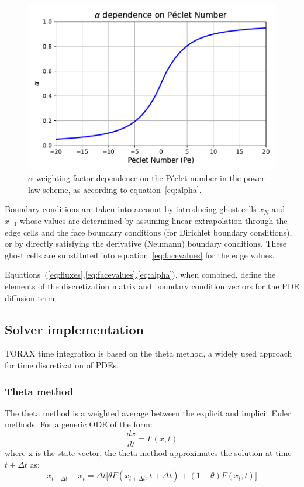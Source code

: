 \documentclass[aps, reprint, nofootinbib]{revtex4-2}
\begin{document}
\begin{figure}[hbt]
    \includegraphics[width=1.0\linewidth]{figure3_peclet.pdf}
    \caption{\footnotesize $\alpha$ weighting factor dependence on the P\'{e}clet number in the power-law scheme, as according to equation~\ref{eq:alpha}.}
    \label{fig:peclet}
\end{figure}

Boundary conditions are taken into account by introducing ghost cells $x_{N}$ and $x_{-1}$ whose values are determined by assuming linear extrapolation through the edge cells and the face boundary conditions (for Dirichlet boundary conditions), or by directly satisfying the derivative (Neumann) boundary conditions. These ghost cells are substituted into equation~\ref{eq:facevalues} for the edge values.

Equations~(\ref{eq:fluxes},\ref{eq:facevalues},\ref{eq:alpha}), when combined, define the elements of the discretization matrix and boundary condition vectors for the PDE diffusion term.

\subsection{Solver implementation}

TORAX time integration is based on the theta method, a widely used approach for time discretization of PDEs. 
\subsubsection{Theta method}
The theta method is a weighted average between the explicit and implicit Euler methods. For a generic ODE of the form: 
\begin{equation}
\frac{dx}{dt} = F(x, t)
\end{equation}
where x is the state vector, the theta method approximates the solution at time $t + \Delta t$ as:
\begin{equation}
\label{eq:theta}
x_{t + \Delta t} - x_t = \Delta t \big[ \theta F(x_{t + \Delta t}, t + \Delta t) + (1 - \theta) F(x_t, t)\big]
\end{equation}
\end{document}
